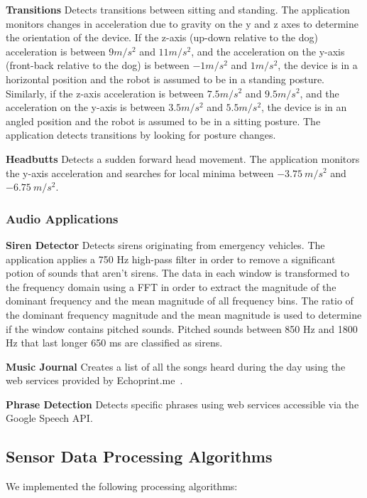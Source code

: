 {\bf Transitions} Detects transitions between sitting and
  standing.  The application monitors changes in acceleration due to
  gravity on the y and z axes to determine the orientation of the
  device. If the z-axis (up-down relative to the dog) acceleration is
  between $9 m/s^2$ and $11 m/s^2$, and the acceleration on the y-axis
  (front-back relative to the dog) is between $-1 m/s^2$ and $1
  m/s^2$, the device is in a horizontal position and the robot is
  assumed to be in a standing posture. Similarly, if the z-axis
  acceleration is between $7.5 m/s^2$ and $9.5 m/s^2$, and the
  acceleration on the y-axis is between $3.5 m/s^2$ and $5.5 m/s^2$,
  the device is in an angled position and the robot is assumed to be
  in a sitting posture. The application detects transitions by looking
  for posture changes.

{\bf Headbutts} Detects a sudden forward head movement.  The
  application monitors the y-axis acceleration and searches for local
  minima between $-3.75\:m/s^2$ and $-6.75\:m/s^2$.

\subsubsection{Audio Applications}

{\bf Siren Detector} Detects sirens originating from
emergency vehicles.  The application applies a 750 Hz high-pass filter 
in order to remove a significant
potion of sounds that aren't sirens.  The data in each window is transformed 
to the frequency domain using a FFT in order to extract the magnitude of the 
dominant frequency and the mean magnitude of all frequency bins.  The ratio
of the dominant frequency magnitude and the mean magnitude is used to determine
if the window contains pitched sounds.  Pitched sounds between 850 Hz and 1800 Hz
that last longer 650 ms are classified as sirens. 

{\bf Music Journal} Creates a list of all the songs heard during the
day using the web services provided by Echoprint.me~\cite{echoprint}.

{\bf Phrase Detection} Detects specific phrases using web services
accessible via the Google Speech API.


\subsection{Sensor Data Processing Algorithms}
\label{sec:sensorDataAlgorithms}


We implemented the following processing algorithms:


